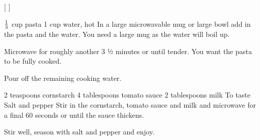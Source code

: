 
[
]

\begin{step}
$\frac{1}{3}$ cup pasta
1 cup water, hot
\method
In a large microwavable mug or large bowl add in the pasta and the water. You need a large mug as the water will boil up.

Microwave for roughly another 3 ½ minutes or until tender. You want the pasta to be fully cooked.

Pour off the remaining cooking water.
\end{step}

\begin{step}
2 teaspoons cornstarch
4 tablespoons tomato sauce
2 tablespoons milk
To taste Salt and pepper
\method
Stir in the cornstarch, tomato sauce and milk and microwave for a final 60 seconds or until the sauce thickens.

Stir well, season with salt and pepper and enjoy.
\end{step}